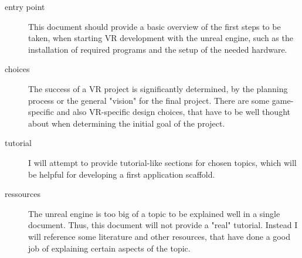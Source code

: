 \begin{description}
\item[entry point] This document should provide a basic overview of the first steps to be taken, when starting VR development with the unreal engine, such as the installation of required programs and the setup of the needed hardware.
\item[choices] The success of a VR project is significantly determined, by the planning process or the general "vision" for the final project. There are some game-specific and also VR-specific design choices, that have to be well thought about when determining the initial goal of the project.
\item[tutorial] I will attempt to provide tutorial-like sections for chosen topics, which will be helpful for developing a first application scaffold.
\item[ressources] The unreal engine is too big of a topic to be explained well in a single document. Thus, this document will not provide a "real" tutorial. Instead I will reference some literature and other resources, that have done a good job of explaining certain aspects of the topic.
\end{description}

